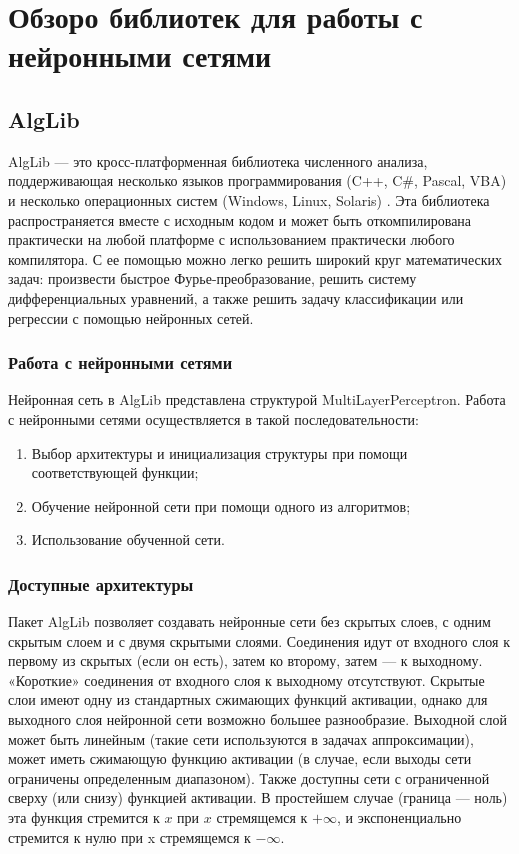 \section{Обзоро библиотек для работы с нейронными сетями}
\subsection{AlgLib}

AlgLib — это кросс-платформенная библиотека численного анализа, поддерживающая
несколько языков программирования (C++, C\#, Pascal, VBA) и несколько
операционных систем (Windows, Linux, Solaris) \cite{alglib_doc}. Эта библиотека
распространяется вместе с исходным кодом и может быть откомпилирована
практически на любой платформе с использованием практически любого компилятора.
С ее помощью можно легко решить широкий круг математических задач: произвести
быстрое Фурье-преобразование, решить систему дифференциальных уравнений, а также
решить задачу классификации или регрессии с помощью нейронных сетей.

\subsubsection{Работа с нейронными сетями}

Нейронная сеть в AlgLib представлена структурой MultiLayerPerceptron. Работа с
нейронными сетями осуществляется в такой последовательности:

\begin{enumerate}
    \item Выбор архитектуры и инициализация структуры при помощи соответствующей
        функции;
    \item Обучение нейронной сети при помощи одного из алгоритмов;
    \item Использование обученной сети.
\end{enumerate}

\subsubsection{Доступные архитектуры}

Пакет AlgLib позволяет создавать нейронные сети без скрытых слоев, с одним
скрытым слоем и с двумя скрытыми слоями. Соединения идут от входного слоя к
первому из скрытых (если он есть), затем ко второму, затем — к выходному.
«Короткие» соединения от входного слоя к выходному отсутствуют. Скрытые слои
имеют одну из стандартных сжимающих функций активации, однако для выходного слоя
нейронной сети возможно большее разнообразие. Выходной слой может быть линейным
(такие сети используются в задачах аппроксимации), может иметь сжимающую функцию
активации (в случае, если выходы сети ограничены определенным диапазоном). Также
доступны сети с ограниченной сверху (или снизу) функцией активации. В простейшем
случае (граница — ноль) эта функция стремится к $x$ при $x$ стремящемся к
$+\infty$, и экспоненциально стремится к нулю при x стремящемся к $-\infty$.

